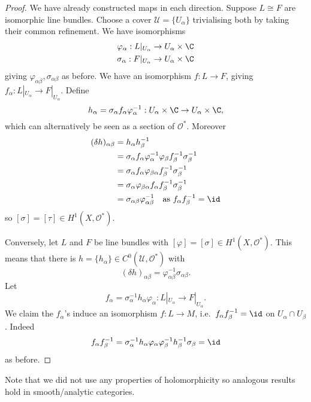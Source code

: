 \documentclass[a4paper]{article}
\begin{document}
\begin{proof}
  We have already constructed maps in each direction. Suppose \(L \cong F\) are isomorphic line bundles. Choose a cover \(\mathcal U = \{U_\alpha\}\) trivialising both by taking their common refinement. We have isomorphisms
  \begin{align*}
    \varphi_\alpha: L|_{U_\alpha} &\to U_\alpha \times \C \\
    \sigma_\alpha: F|_{U_\alpha} &\to U_\alpha \times \C \\
  \end{align*}
  giving \(\varphi_{\alpha\beta}, \sigma_{\alpha\beta}\) as before. We have an isomorphism \(f: L \to F\), giving \(f_\alpha: L|_{U_\alpha} \to F|_{U_\alpha}\). Define
  \[
    h_\alpha = \sigma_\alpha f_\alpha \varphi_\alpha^{-1}: U_\alpha \times \C \to U_\alpha \times \C,
  \]
  which can alternatively be seen as a section of \(\mathcal O^*\). Moreover
  \begin{align*}
    (\delta h)_{\alpha\beta}
    &= h_\alpha h_\beta^{-1} \\
    &= \sigma_\alpha f_\alpha \varphi_\alpha^{-1} \varphi_\beta f_\beta^{-1} \sigma_\beta^{-1} \\
    &= \sigma_\alpha f_\alpha \varphi_{\beta\alpha} f_\beta^{-1} \sigma_\beta^{-1} \\
    &= \sigma_\alpha \varphi_{\beta\alpha} f_\alpha f_\beta^{-1} \sigma_\beta^{-1} \\
    &= \sigma_{\alpha\beta} \varphi_{\alpha\beta}^{-1} \quad \text{as } f_\alpha f_\beta^{-1} = \id
  \end{align*}
  so \([\sigma] = [\tau] \in H^1(X, \mathcal O^*)\).

  Conversely, let \(L\) and \(F\) be line bundles with \([\varphi] = [\sigma] \in H^1(X, \mathcal O^*)\). This means that there is \(h = \{h_\alpha\} \in C^0(\mathcal U, \mathcal O^*)\) with
  \[
    (\delta h)_{\alpha\beta} = \varphi_{\alpha\beta}^{-1} \sigma_{\alpha\beta}.
  \]
  Let
  \[
    f_\alpha = \sigma_\alpha^{-1} h_\alpha \varphi_\alpha: L|_{U_\alpha} \to F|_{U_\alpha}.
  \]
  We claim the \(f_\alpha\)'s induce an isomorphism \(f: L \to M\), i.e.\ \(f_\alpha f_\beta^{-1} = \id\) on \(U_\alpha \cap U_\beta\). Indeed
  \[
    f_\alpha f_\beta^{-1} = \sigma_\alpha^{-1} h_\alpha \varphi_\alpha \varphi_\beta^{-1} h_\beta^{-1} \sigma_\beta = \id
  \]
  as before.
\end{proof}

Note that we did not use any properties of holomorphicity so analogous results hold in smooth/analytic categories.
\end{document}
